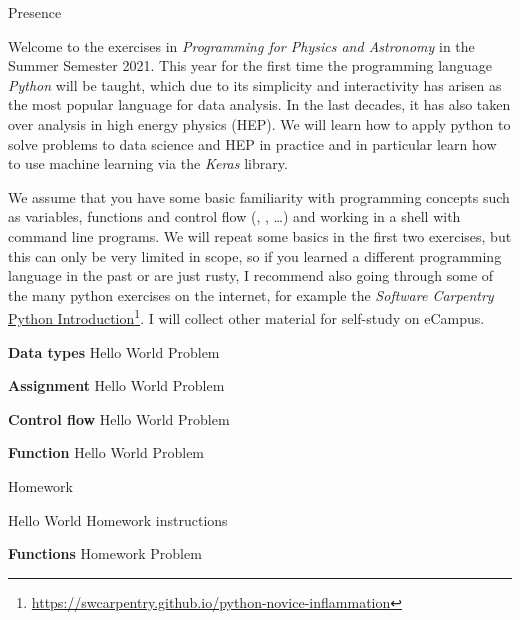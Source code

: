 \documentclass[english,ngerman]{article}
\begin{document}


\begin{exam}[Presence]{Presence}
  \begin{instructions}[Introduction]

    Welcome to the exercises in \emph{Programming for Physics and Astronomy} in
    the Summer Semester 2021. This year for the first time the programming
    language \emph{Python} will be taught, which due to its simplicity and
    interactivity has arisen as the most popular language for data analysis. In
    the last decades, it has also taken over analysis in high energy physics (HEP). We
    will learn how to apply python to solve problems to data science and HEP in
    practice and in particular learn how to use machine learning via the
    \emph{Keras} library.

    We assume that you have some basic familiarity with programming concepts
    such as variables, functions and control flow (,
    , \ldots) and working in a shell with command line programs.
    We will repeat some basics in the first two exercises, but this can only be
    very limited in scope, so if you learned a different programming language in
    the past or are just rusty, I recommend also going through some of the many
    python exercises on the internet, for example the \emph{Software Carpentry}
    \href{https://swcarpentry.github.io/python-novice-inflammation}{Python Introduction}\footnote{%
      \url{https://swcarpentry.github.io/python-novice-inflammation}}.
    I will collect other material for self-study on eCampus.

  \end{instructions}
  \begin{problem}\textbf{Data types}
    Hello World Problem
  \end{problem}
  \begin{problem}\textbf{Assignment}
    Hello World Problem
  \end{problem}
  \begin{problem}\textbf{Control flow}
    Hello World Problem
  \end{problem}
  \begin{problem}\textbf{Function}
    Hello World Problem
  \end{problem}
\end{exam}

\newpage
\begin{exam}[Homework]{Homework}
  \begin{instructions}
    Hello World Homework instructions
  \end{instructions}

  \begin{problem}[3]{\textbf{Functions}}
    Homework Problem
  \end{problem}
\end{exam}
\end{document}

